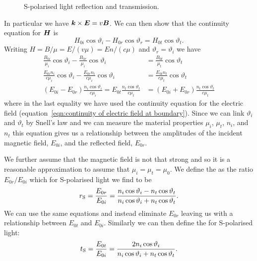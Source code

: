 \begin{figure}[ht]
        \caption{S-polarised light reflection and transmission.}
        \label{fig:S-polarised light}
    \end{figure}
    In particular we have \(\bm{k}\times\bm{E} = v\bm{B}\).
    We can then show that the continuity equation for \(\bm{H}\) is
    \[H_{0i}\cos\vartheta_i - H_{0r}\cos\vartheta_r = H_{0t}\cos\vartheta_t.\]
    Writing \(H = B/\mu = E/(v\mu) = En/(c\mu)\) and \(\vartheta_r = \vartheta_i\) we have
    \begin{align*}
        \frac{B_{0i}}{\mu_i}\cos\vartheta_i - \frac{B_{0r}}{\mu_i}\cos\vartheta_i &= \frac{B_{0t}}{\mu_t}\cos\vartheta_t\\
        \frac{E_{0i}n_i}{c\mu_i}\cos\vartheta_i - \frac{E_{0r}n_i}{c\mu_i}\cos\vartheta_i &= \frac{E_{0t}n_t}{c\mu_t}\cos\vartheta_t\\
        (E_{0i} - E_{0r})\frac{n_i\cos\vartheta_i}{c\mu_i} = E_{0t}\frac{n_t\cos\vartheta_t}{c\mu_t} &= (E_{0i} + E_{0r})\frac{n_t\cos\vartheta_t}{c\mu_t}
    \end{align*}
    where in the last equality we have used the continuity equation for the electric field (equation~\ref{eqn:continuity of electric field at boundary}).
    Since we can link \(\vartheta_i\) and \(\vartheta_t\) by Snell's law and we can measure the material properties \(\mu_i\), \(\mu_t\), \(n_i\), and \(n_t\) this equation gives us a relationship between the amplitudes of the incident magnetic field, \(E_{0i}\), and the reflected field, \(E_{0r}\).
    
    We further assume that the magnetic field is not that strong and so it is a reasonable approximation to assume that \(\mu_i = \mu_t = \mu_0\).
    We define the  as the ratio \(E_{0r}/E_{0i}\) which for S-polarised light we find to be
    \[{r}_{\mathrm{{S}}} = \frac{E_{0r}}{E_{0i}} = \frac{n_i\cos\vartheta_{i} - n_t\cos\vartheta_{t}}{n_i\cos\vartheta_i + n_t\cos\vartheta_t}.\]
    We can use the same equations and instead eliminate \(E_{0r}\) leaving us with a relationship between \(E_{0t}\) and \(E_{0i}\).
    Similarly we can then define the  for S-polarised light:
    \[{t}_{\mathrm{{S}}} = \frac{E_{0t}}{E_{0i}} = \frac{2n_{i}\cos\vartheta_{i}}{n_i\cos\vartheta_{i} + n_t\cos\vartheta_{t}}.\]
    
